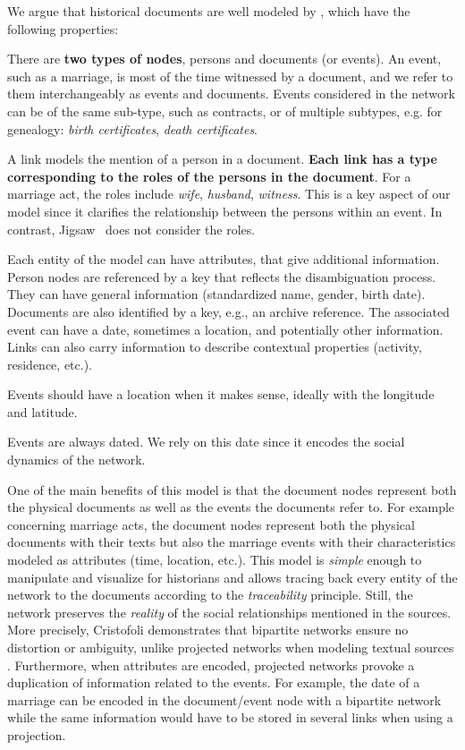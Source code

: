 We argue that historical documents are well modeled by \modelplural, which have the following properties:
\begin{description}[nosep,leftmargin=2mm]
    \item[{Bipartite:}] There are \textbf{two types of nodes}, persons and documents (or events). An event, such as a marriage, is most of the time witnessed by a document, and we refer to them interchangeably as events and documents. Events considered in the network can be of the same sub-type, such as contracts, or of multiple subtypes, e.g. for genealogy: \emph{birth certificates}, \emph{death certificates}.
    \item[Links and Roles:] A link models the mention of a person in a document. \textbf{Each link has a type corresponding to the roles of the persons in the document}. For a marriage act, the roles include \emph{wife}, \emph{husband}, \emph{witness}. This is a key aspect of our model since it clarifies the relationship between the persons within an event. In contrast, Jigsaw~\cite{Stasko} does not consider the roles.
    \item[{Multivariate:}] Each entity of the model can have attributes, that give additional information. Person nodes are referenced by a key that reflects the disambiguation process. They can have general information (standardized name, gender, birth date). Documents are also identified by a key, e.g., an archive reference. The associated event can have a date, sometimes a location, and potentially other information. Links can also carry information to describe contextual properties (activity, residence, etc.).
    \item[{Geolocated:}] Events should have a location when it makes sense, ideally with the longitude and latitude.
    \item[{Dynamic:}] Events are always dated. We rely on this date since it encodes the social dynamics of the network.
\end{description}

One of the main benefits of this model is that the document nodes represent both the physical documents as well as the events the documents refer to.
For example concerning marriage acts, the document nodes represent both the physical documents with their texts but also the marriage events with their characteristics modeled as attributes (time, location, etc.).
This model is \textit{simple} enough to manipulate and visualize for historians and allows tracing back every entity of the network to the documents according to the \textit{traceability} principle. Still, the network preserves the \textit{reality} of the social relationships mentioned in the sources.
More precisely, Cristofoli demonstrates that bipartite networks ensure no distortion or ambiguity, unlike projected networks when modeling textual sources \cite{cristofoli_aux_2008}.
Furthermore, when attributes are encoded, projected networks provoke a duplication of information related to the events. For example, the date of a marriage can be encoded in the document/event node with a bipartite network while the same information would have to be stored in several links when using a projection.


